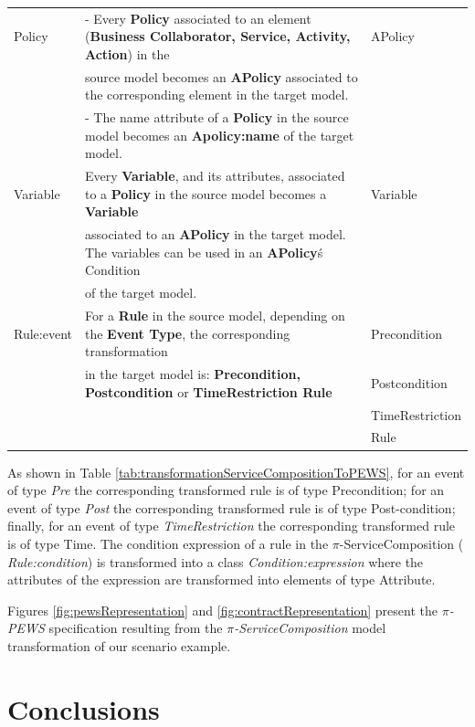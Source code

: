 \begin{table}[ht!]
\begin{tabular}{l|l|l}
    Policy   & - Every \textbf{Policy} associated to an element
    (\textbf{Business Collaborator, Service, Activity, Action}) in the   &
    APolicy\\
    & source model becomes an \textbf{APolicy} associated to the corresponding
element in the target model. & \\
   & - The name attribute of a \textbf{Policy} in the source model becomes an
\textbf{Apolicy:name} of the target model. & \\
    \hline
    Variable   &  Every \textbf{Variable}, and its attributes, associated to a
    \textbf{Policy} in the source model
    becomes a \textbf{Variable}   & Variable\\
    &associated to an \textbf{APolicy} in the target
    model. The variables can be used in an \textbf{APolicy}\'s Condition &\\
    & of the target model.&\\
    \hline
    Rule:event &  For a \textbf{Rule} in the source
    model, depending on the \textbf{Event Type}, the corresponding transformation
    & Precondition \\ &   in the target model is: \textbf{Precondition,
    Postcondition} or \textbf{TimeRestriction Rule}  & Postcondition\\
    &&TimeRestriction\\
    &&Rule\\
    \hline
\end{tabular}
\end{table}

As shown in Table \ref{tab:transformationServiceCompositionToPEWS}, for an event
of type {\sc\em Pre} the corresponding transformed rule is of type {\sc
Precondition}; for an event of type {\sc\em Post} the corresponding transformed
rule is of type {\sc Post-condition}; finally, for an event of type {\sc\em
TimeRestriction} the corresponding transformed rule is of type {\sc Time}. The
condition expression of a rule in the $\pi$-ServiceComposition ({\sc\em
Rule:condition}) is transformed into a class {\sc\em Condition:expression} where
the attributes of the expression are transformed into elements of type {\sc
Attribute}.

Figures \ref{fig:pewsRepresentation} and \ref{fig:contractRepresentation}
present the \textit{$\pi$-PEWS} specification resulting from the
\textit{$\pi$-ServiceComposition} model transformation of our scenario example.

\section{Conclusions}
\label{sec:pisodm_conclusion}


